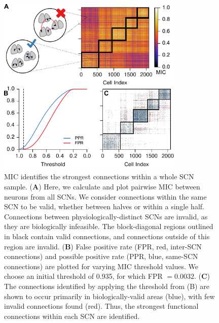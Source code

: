\begin{figure}[p]
    \begin{center}
        \includegraphics[width=3.5in]{chap3/figures/fig2.pdf}
    \end{center}
    \caption{\label{fig:ctrl}MIC identifies the strongest connections within a whole SCN sample.
	(\textbf{A}) Here, we calculate and plot pairwise MIC between neurons from all SCNs. We consider connections within the same SCN to be valid, whether between halves or within a single half. Connections between physiologically-distinct SCNs are invalid, as they are biologically infeasible. The block-diagonal regions outlined in black contain valid connections, and connections outside of this region are invalid.  
    (\textbf{B}) False positive rate (FPR, red, inter-SCN connections) and possible positive rate (PPR, blue, same-SCN connections) are plotted for varying MIC threshold values. We choose an initial threshold of 0.935, for which FPR $= 0.0032$.
    (\textbf{C}) The connections identified by applying the threshold from (B) are shown to occur primarily in biologically-valid areas (blue), with few invalid connections found (red). Thus, the strongest functional connections within each SCN are identified.
}
\end{figure}




